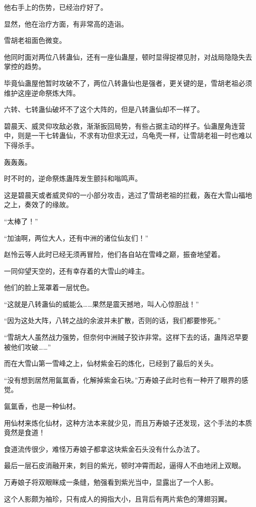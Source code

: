 \begin{this_body}
他右手上的伤势，已经治疗好了。

显然，他在治疗方面，有非常高的造诣。

雪胡老祖面色微变。

他同时面对两位八转蛊仙，还有一座仙蛊屋，顿时显得捉襟见肘，对战局隐隐失去掌控的趋势。

毕竟仙蛊屋他暂时攻破不了，两位八转蛊仙也是强者，更关键的是，雪胡老祖必须维护这座逆命祭炼大阵。

六转、七转蛊仙破坏不了这个大阵的，但是八转蛊仙却不一样了。

碧晨天、威灵仰攻敌必救，渐渐扳回局势，有些占据主动的样子。仙蛊屋角连营中，则是一干七转蛊仙，不求有功但求无过，乌龟壳一样，让雪胡老祖一时也难以下得杀手。

轰轰轰。

时不时的，逆命祭炼蛊阵发生颤抖和嗡鸣声。

这是碧晨天或者威灵仰的一小部分攻击，逃过了雪胡老祖的拦截，轰在大雪山福地之上，奏效了的缘故。

“太棒了！”

“加油啊，两位大人，还有中洲的诸位仙友们！”

赵怜云等人此时已经无须再冒险，他们各自站在雪峰之巅，振奋地望着。

一同仰望天空的，还有幸存着的大雪山的峰主。

他们的脸上笼罩着一层忧色。

“这就是八转蛊仙的威能么……果然是震天撼地，叫人心惊胆战！”

“因为这处大阵，八转之战的余波并未扩散，否则的话，我们都要惨死。”

“雪胡大人虽然战力强势，但奈何中洲贼子狡诈非常。这样下去的话，蛊阵迟早要被他们攻破……”

而在大雪山第一雪峰之上，仙材紫金石的炼化，已经到了最后的关头。

“没有想到居然用氤氲香，化解掉紫金石块。”万寿娘子此时也有一种开了眼界的感觉。

氤氲香，也是一种仙材。

用仙材来炼化仙材，这种方法本来就少见，而且万寿娘子还发现，这个手法的本质竟然是食道！

食道流传很少，难怪万寿娘子都拿这块紫金石头没有什么办法了。

最后一层石皮消融开来，刺目的紫光，顿时冲霄而起，逼得人不由地闭上双眼。

万寿娘子将双眼眯成一条缝，勉强看到紫光当中，显露出了一个人影。

这个人影颇为袖珍，只有成人的拇指大小，且背后有两片紫色的薄翅羽翼。


\end{this_body}
